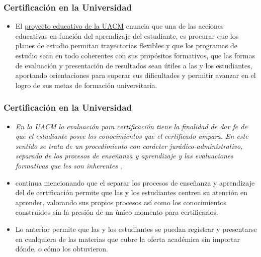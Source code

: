 \documentclass[xcolor=dvipsnames]{beamer}
\begin{document}
\begin{frame}\frametitle{Certificaci\'on en la Universidad}


\begin{itemize}

\item El \href{https://drive.google.com/file/d/0B6AEksrqo4h1M2Q5OWVhOGEtODNlNy00M2M2LThkNTctZjE0ZjA4ZGJlZWZj/view?resourcekey=0-9eA5mzOWlPqKF8MTeYH9Iw}{proyecto educativo de la UACM} enuncia que una de las acciones educativas en funci\'on del aprendizaje del estudiante, es procurar que los planes de estudio permitan trayectorias flexibles y que los programas de estudio sean en todo coherentes con sus prop\'ositos formativos, que las formas de evaluaci\'on y presentaci\'on de resultados sean \'utiles a las y los estudiantes, aportando orientaciones  para superar sus dificultades y permitir avanzar en el logro de sus metas de formaci\'on universitaria.



\end{itemize}





\end{frame}


\begin{frame}\frametitle{Certificaci\'on en la Universidad}
\begin{itemize}

\item \textit{En la UACM la evaluaci\'on para certificaci\'on tiene la finalidad de dar fe de que el estudiante posee los conocimientos que el certificado ampara. En este sentido se trata de un procedimiento con car\'acter jur\'adico-administrativo, separado de los procesos de ense\~nanza y aprendizaje y las evaluaciones formativas que les son inherentes} \cite{ProyectoEducativo}, 

\item continua mencionando que el separar los procesos de ense\~nanza y aprendizaje del de certificaci\'on permite que las y los estudiantes centren su atenci\'on en aprender,  valorando sus propios procesos as\'i como los conocimientos construidos sin la presi\'on de un \'unico momento para certificarlos. 

\item Lo anterior permite que las y los estudiantes se puedan registrar y presentarse en cualquiera de las materias que cubre la oferta acad\'emica sin importar d\'onde, o c\'omo los obtuvieron. 



\end{itemize}





\end{frame}
\end{document}
